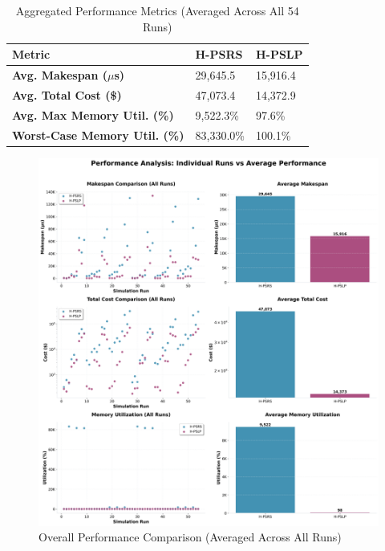 \documentclass{article}
\begin{document}
\begin{table}[h!]
\centering
\caption{Aggregated Performance Metrics (Averaged Across All 54 Runs)}
\label{tab:agg_metrics}
\begin{tabularx}{\textwidth}{@{}lXX@{}}
\toprule
\textbf{Metric} & \textbf{H-PSRS} & \textbf{H-PSLP} \\ \midrule
\textbf{Avg. Makespan ($\mu$s)} & 29,645.5 & 15,916.4 \\
\textbf{Avg. Total Cost (\$)} & 47,073.4 & 14,372.9 \\
\textbf{Avg. Max Memory Util. (\%)} & 9,522.3\% & 97.6\% \\
\textbf{Worst-Case Memory Util. (\%)} & 83,330.0\% & 100.1\% \\ \bottomrule
\end{tabularx}
\end{table}


\begin{figure}[h!]
    \centering
    \includegraphics[width=1\linewidth]{images/agg_metrics_comparison.png}
    \caption{Overall Performance Comparison (Averaged Across All Runs)}
    \label{fig:overall_perf}
\end{figure}
\end{document}
